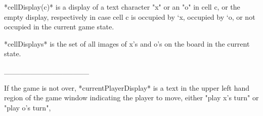 \documentclass{led_doc}
\begin{document}
\begin{ledCmnt}
*cellDisplay(c)* is a display of a text character "x" or an "o" in cell c, or the empty display, respectively in case cell c is occupied by `x, occupied by `o, or not occupied in the current game state.
\end{ledCmnt}

\begin{ledDef}
\end{ledDef}

\begin{ledDef}
\end{ledDef}

\begin{ledDef}
\end{ledDef}

\begin{ledCmnt}
*cellDisplays* is the set of all images of x's and o's on the board in the current state.
\end{ledCmnt}

\begin{ledDef}
\end{ledDef}

\begin{ledDef}
\end{ledDef}

\begin{ledCmnt}
________________

If the game is not over, *currentPlayerDisplay* is a text in the upper left hand region of the game window indicating the player to move, either "play x's turn" or "play o's turn",
\end{ledCmnt}

\begin{ledDef}
\end{ledDef}
\end{document}
